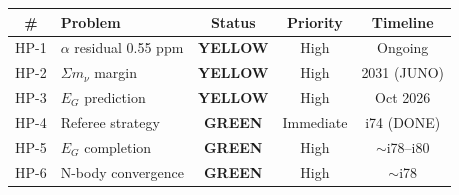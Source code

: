 \documentclass[11pt,a4paper]{article}
\newcommand{\GREEN}{\textcolor{dfdgreen}{\textbf{GREEN}}}
\newcommand{\YELLOW}{\textcolor{dfdyellow}{\textbf{YELLOW}}}
\begin{document}
\begin{center}
\begin{tabular}{clccc}
\toprule
\textbf{\#} & \textbf{Problem} & \textbf{Status} & \textbf{Priority} & \textbf{Timeline} \\
\midrule
HP-1 & $\alpha$ residual 0.55 ppm & \YELLOW & High & Ongoing \\
HP-2 & $\Sigma m_\nu$ margin & \YELLOW & High & 2031 (JUNO) \\
HP-3 & $E_G$ prediction & \YELLOW & High & Oct 2026 \\
HP-4 & Referee strategy & \GREEN & Immediate & i74 (DONE) \\
HP-5 & $E_G$ completion & \GREEN & High & $\sim$i78--i80 \\
HP-6 & N-body convergence & \GREEN & High & $\sim$i78 \\
\bottomrule
\end{tabular}
\end{center}
\end{document}

